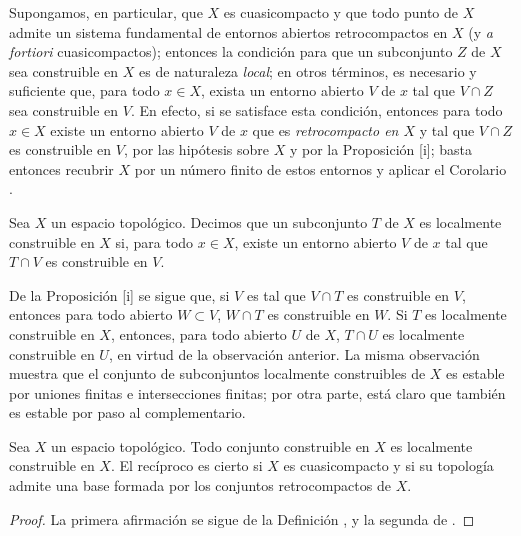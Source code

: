\documentclass[oneside]{amsart}
\newcommand{\oldpage}[2][]{{\marginnote{\normalfont\textbf{#1}~|~#2}}\ignorespaces}
\let\EGAOriginalLabel\label
\renewcommand{\label}[1]{\phantomsection\EGAOriginalLabel{#1}}
\begin{document}
\begin{env}[9.1.10]
\label{0.9.1.10}
Supongamos, en particular, que $X$ es cuasicompacto y que todo punto
\oldpage[0\textsubscript{III}]{14}
de $X$ admite un sistema fundamental de entornos abiertos retrocompactos en $X$ (y \emph{a fortiori} cuasicompactos); entonces la condición para que un subconjunto $Z$ de $X$ sea construible en $X$ es de naturaleza \emph{local}; en otros términos, es necesario y suficiente que, para todo $x\in X$, exista un entorno abierto $V$ de $x$ tal que $V\cap Z$ sea construible en $V$.
En efecto, si se satisface esta condición, entonces para todo $x\in X$ existe un entorno abierto $V$ de $x$ que es \emph{retrocompacto en $X$} y tal que $V\cap Z$ es construible en $V$, por las hipótesis sobre $X$ y por la Proposición [i]; basta entonces recubrir $X$ por un número finito de estos entornos y aplicar el Corolario .
\end{env}

\begin{definition}[9.1.11]
\label{0.9.1.11}
Sea $X$ un espacio topológico.
Decimos que un subconjunto $T$ de $X$ es localmente construible en $X$ si, para todo $x\in X$, existe un entorno abierto $V$ de $x$ tal que $T\cap V$ es construible en $V$.
\end{definition}

De la Proposición [i] se sigue que, si $V$ es tal que $V\cap T$ es construible en $V$, entonces para todo abierto $W\subset V$, $W\cap T$ es construible en $W$.
Si $T$ es localmente construible en $X$, entonces, para todo abierto $U$ de $X$, $T\cap U$ es localmente construible en $U$, en virtud de la observación anterior.
La misma observación muestra que el conjunto de subconjuntos localmente construibles de $X$ es estable por uniones finitas e intersecciones finitas; por otra parte, está claro que también es estable por paso al complementario.

\begin{proposition}[9.1.12]
\label{0.9.1.12}
Sea $X$ un espacio topológico.
Todo conjunto construible en $X$ es localmente construible en $X$.
El recíproco es cierto si $X$ es cuasicompacto y si su topología admite una base formada por los conjuntos retrocompactos de $X$.
\end{proposition}

\begin{proof}
La primera afirmación se sigue de la Definición , y la segunda de .
\end{proof}
\end{document}
